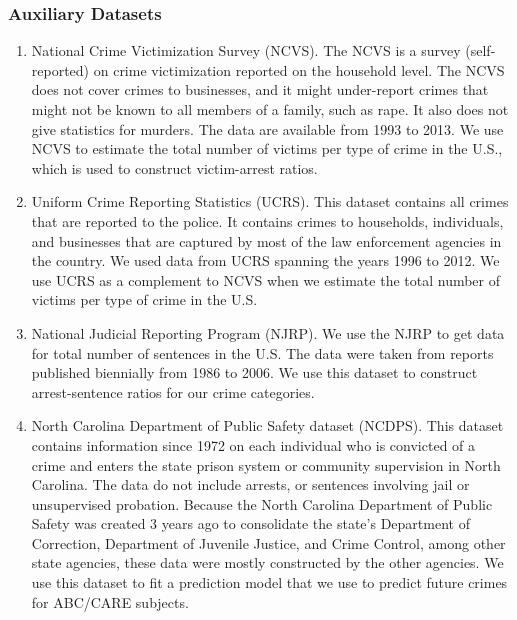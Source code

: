 \subsubsection{Auxiliary Datasets}
\begin{enumerate}
\item National Crime Victimization Survey (NCVS). The NCVS is a survey (self-reported) on crime victimization reported on the household level. The NCVS does not cover crimes to businesses, and it might under-report crimes that might not be known to all members of a family, such as rape. It also does not give statistics for murders. The data are available from 1993 to 2013. We use NCVS to estimate the total number of victims per type of crime in the U.S., which is used to construct victim-arrest ratios.
\item Uniform Crime Reporting Statistics (UCRS). This dataset contains all crimes that are reported to the police. It contains crimes to households, individuals, and businesses that are captured by most of the law enforcement agencies in the country. We used data from UCRS spanning the years 1996 to 2012. We use UCRS as a complement to NCVS when we estimate the total number of victims per type of crime in the U.S. %
\item National Judicial Reporting Program (NJRP). We use the NJRP to get data for total number of sentences in the U.S. The data were taken from reports published biennially from 1986 to 2006. We use this dataset to construct arrest-sentence ratios for our crime categories.
\item North Carolina Department of Public Safety dataset (NCDPS). This dataset contains information since 1972 on each individual who is convicted of a crime and enters the state prison system or community supervision in North Carolina. The data do not include arrests, or sentences involving jail or unsupervised probation. Because the North Carolina Department of Public Safety was created 3 years ago to consolidate the state's Department of Correction, Department of Juvenile Justice, and Crime Control, among other state agencies, these data were mostly constructed by the other agencies. We use this dataset to fit a prediction model that we use to predict future crimes for ABC/CARE subjects.
\end{enumerate}

